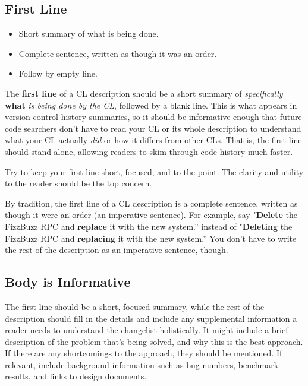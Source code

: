 \documentclass[
]{article}
\providecommand{\tightlist}{%
  \setlength{\itemsep}{0pt}\setlength{\parskip}{0pt}}
\begin{document}
\subsection{First Line}\label{first-line}

\begin{itemize}
\tightlist
\item
  Short summary of what is being done.
\item
  Complete sentence, written as though it was an order.
\item
  Follow by empty line.
\end{itemize}

The \textbf{first line} of a CL description should be a short summary of
\emph{specifically} \textbf{what} \emph{is being done by the CL},
followed by a blank line. This is what appears in version control
history summaries, so it should be informative enough that future code
searchers don't have to read your CL or its whole description to
understand what your CL actually \emph{did} or how it differs from other
CLs. That is, the first line should stand alone, allowing readers to
skim through code history much faster.

Try to keep your first line short, focused, and to the point. The
clarity and utility to the reader should be the top concern.

By tradition, the first line of a CL description is a complete sentence,
written as though it were an order (an imperative sentence). For
example, say "\textbf{Delete} the FizzBuzz RPC and \textbf{replace} it
with the new system.'' instead of "\textbf{Deleting} the FizzBuzz RPC
and \textbf{replacing} it with the new system.'' You don't have to write
the rest of the description as an imperative sentence, though.

\subsection{Body is Informative}\label{informative}

The \hyperref[first-line]{first line} should be a short, focused
summary, while the rest of the description should fill in the details
and include any supplemental information a reader needs to understand
the changelist holistically. It might include a brief description of the
problem that's being solved, and why this is the best approach. If there
are any shortcomings to the approach, they should be mentioned. If
relevant, include background information such as bug numbers, benchmark
results, and links to design documents.
\end{document}
